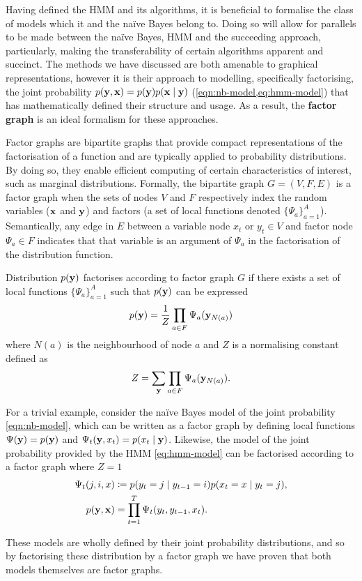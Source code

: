 \documentclass[../main.tex]{subfiles}
\begin{document}
Having defined the HMM and its algorithms, it is beneficial to formalise the class of models which it and the na{\"i}ve Bayes belong to.
Doing so will allow for parallels to be made between the na{\"i}ve Bayes, HMM and the succeeding approach, particularly, making the transferability of certain algorithms apparent and succinct.
The methods we have discussed are both amenable to graphical representations, however it is their approach to modelling, specifically factorising, the joint probability $p(\mathbf{y},\mathbf{x}) = p(\mathbf{y})p(\mathbf{x} \mid \mathbf{y})$ (\cref{eqn:nb-model,eq:hmm-model}) that has mathematically defined their structure and usage.
As a result, the \textbf{factor graph} is an ideal formalism for these approaches.

Factor graphs are bipartite graphs that provide compact representations of the factorisation of a function and are typically applied to probability distributions.
By doing so, they enable efficient computing of certain characteristics of interest, such as marginal distributions.
Formally, the bipartite graph $G = (V,F,E)$ is a factor graph when the sets of nodes $V$ and $F$ respectively index the random variables ($\mathbf{x}$ and $\mathbf{y}$) and factors (a set of local functions denoted $\{\Psi_a \}_{a=1}^A$).
Semantically, any edge in $E$ between a variable node $x_t \text{ or } y_t \in V$ and factor node $\Psi_a \in F$ indicates that that variable is an argument of $\Psi_a$ in the factorisation of the distribution function.
\begin{definition}%
    Distribution $p(\mathbf{y})$ factorises according to factor graph $G$ if there exists a set of local functions $\{ \Psi_a \}_{a=1}^A$ such that $p(\mathbf{y})$ can be expressed
    \begin{equation*}
        p(\mathbf{y}) = \frac{1}{Z} \prod_{a \in F} \Psi_a (\mathbf{y}_{N(a)})
    \end{equation*}
    where $N(a)$ is the neighbourhood of node $a$ and $Z$ is a normalising constant defined as
    \begin{equation*}
        Z = \sum_{\mathbf{y}} \prod_{a \in F} \Psi_a (\mathbf{y}_{N(a)}).
    \end{equation*}
\end{definition}

For a trivial example, consider the na{\"i}ve Bayes model of the joint probability \cref{eqn:nb-model}, which can be written as a factor graph by defining local functions $\Psi(\mathbf{y}) = p(\mathbf{y})$ and $\Psi_t(\mathbf{y},x_t) = p(x_t \mid \mathbf{y})$.
Likewise, the model of the joint probability provided by the HMM \cref{eq:hmm-model} can be factorised according to a factor graph where $Z=1$
\begin{align} \label{eq:hmm-crf-factor-form}
    \Psi_t(j,i,x) &\coloneqq p(y_t=j \mid y_{t-1}=i)p(x_t=x \mid y_t=j), \\
    p(\mathbf{y},\mathbf{x}) &= \prod_{t=1}^T \Psi_t(y_t,y_{t-1},x_t).
\end{align}

These models are wholly defined by their joint probability distributions, and so by factorising these distribution by a factor graph we have proven that both models themselves are factor graphs.
\end{document}
